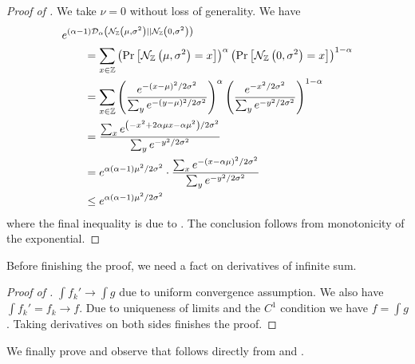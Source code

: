 \documentclass{article}
\begin{document}
\begin{proof}[Proof of ]
	We take $\nu=0$ without loss of generality.
	We have
	\begin{align}
		&e^{(\alpha-1)\mathcal{D}_\alpha\left(\mathcal{N}_{\mathbb{Z}}\left(\mu, \sigma^2\right) || \mathcal{N}_{\mathbb{Z}}\left(0, \sigma^2\right)\right)}\\
		&\qquad=\sum_{x\in\mathbb{Z}}\left(\Pr\left[\mathcal{N}_{\mathbb{Z}}\left(\mu, \sigma^2\right)=x\right]\right)^\alpha\left(\Pr\left[\mathcal{N}_{\mathbb{Z}}\left(0, \sigma^2\right)=x\right]\right)^{1-\alpha}\\
		&\qquad=\sum_{x\in\mathbb{Z}}
			\left(
				\frac{e^{-(x-\mu)^2/2\sigma^2}}{\sum_y e^{-(y-\mu)^2/2\sigma^2}}
			\right)^\alpha
			\left(
				\frac{e^{-x^2/2\sigma^2}}{\sum_y e^{-y^2/2\sigma^2}}
			\right)^{1-\alpha}\\
		&\qquad=\frac{\sum_x e^{\left(-x^2+2\alpha\mu x-\alpha\mu^2\right)/2\sigma^2}}{\sum_y e^{-y^2/2\sigma^2}}\\
		&\qquad=e^{\alpha(\alpha-1)\mu^2/2\sigma^2}\cdot\frac{\sum_x e^{-\left(x-\alpha\mu\right)^2/2\sigma^2}}{\sum_y e^{-y^2/2\sigma^2}}\\
		&\qquad\leq e^{\alpha(\alpha-1)\mu^2/2\sigma^2}
	\end{align}
	where the final inequality is due to .
	The conclusion follows from monotonicity of the exponential.
\end{proof}

Before finishing the proof, we need a fact on derivatives of infinite sum.
\begin{proof}[Proof of ]
	$\int f_k'\rightarrow \int g$ due to uniform convergence assumption.
	We also have $\int f_k'=f_k\rightarrow f$.
	Due to uniqueness of limits and the $C^1$ condition we have $f=\int g$.
	Taking derivatives on both sides finishes the proof.
\end{proof}

We finally prove  and observe that  follows directly from  and .
\end{document}
